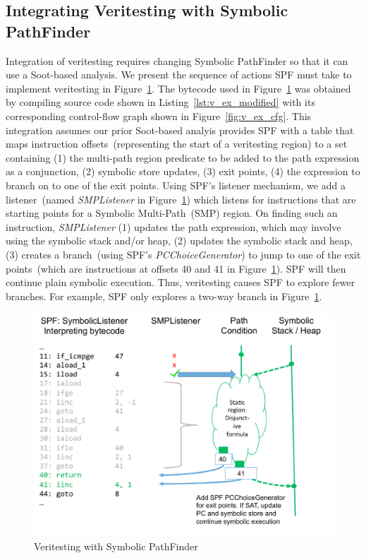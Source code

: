 \subsection{Integrating Veritesting with Symbolic PathFinder}
%
Integration of veritesting requires changing Symbolic PathFinder so that it can 
use a Soot-based analysis.
%
We present the sequence of actions SPF must take to implement veritesting in 
Figure~\ref{fig:spf_veritesting}.
%
The bytecode used in Figure~\ref{fig:spf_veritesting} was obtained by compiling 
source code shown in Listing~\ref{lst:v_ex_modified} with its corresponding 
control-flow graph shown in Figure~\ref{fig:v_ex_cfg}.
%
This integration assumes our prior Soot-based analyis provides SPF 
with a table that maps instruction offsets~(representing the start of a 
veritesting region) to a set containing (1) the multi-path region predicate to be 
added to the path expression as a conjunction, (2) symbolic store
updates, (3) exit points, (4) the expression to branch on to one of the exit points.
%
Using SPF\rq s listener mechanism, we add a listener~(named
\textit{SMPListener} in Figure~\ref{fig:spf_veritesting}) which listens for instructions that are starting points for a Symbolic Multi-Path~(SMP) region.
%
On finding such an instruction, \textit{SMPListener} 
(1) updates the path expression, which may involve using the symbolic stack and/or heap, 
(2) updates the symbolic stack and heap, 
(3) creates a branch~(using SPF's \textit{PCChoiceGenerator}) to 
jump to one of the exit points~(which are instructions at offsets 40 and
41 in Figure~\ref{fig:spf_veritesting}).
%
SPF will then continue plain symbolic execution.
%
Thus, veritesting causes SPF to explore fewer branches.
%
For example, SPF only explores a two-way branch in Figure~\ref{fig:spf_veritesting}.
%
\begin{figure}[]
\caption{Veritesting with Symbolic PathFinder}
\label{fig:spf_veritesting}
\includegraphics[width=\columnwidth]{figures/spf_veritesting}
\end{figure}
%
